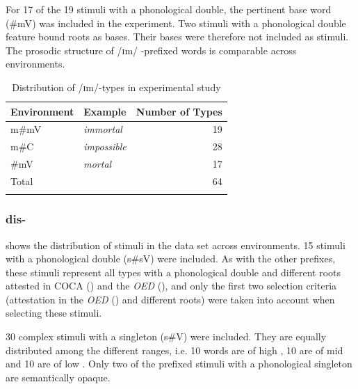 For 17 of the 19 stimuli with a phonological double, the pertinent base word ({\#mV}) was included in the experiment. Two stimuli with a phonological double feature bound roots as bases. Their bases were therefore not included as stimuli. The prosodic structure of /ɪm/ -prefixed words is comparable across environments.



\begin{table}

	\caption{Distribution of /ɪm/-types in experimental study}
	\label{tbl:distribution of im types in experiment}

	
		\begin{tabular} {llr}
\lsptoprule

Environment &Example &Number of   Types\\

 \midrule
 m\#mV&\color{lsMidBlue}\textit{immortal} & 19  \\
  m\#C&\color{lsMidBlue}\textit{impossible} & 28 \\
  \#mV&\color{lsMidBlue}\textit{mortal} & 17 \\
 \midrule
 Total& & 64\\
 \lspbottomrule                                                                                
		\end{tabular}
	
\end{table}



\subsubsection{dis-} \label{dis stimui}

 shows the distribution of  stimuli in the data set across environments. 
15  stimuli with a phonological double (s\#sV) were included. As with the other prefixes, these stimuli represent all types with a phonological double and different roots attested in  {COCA} (\citealt{Davies.20082014}) and the \textit{OED} (\citealt{OED.2013}),  and only the first two selection criteria (attestation in the \textit{OED} (\citealt{OED.2013}) and different roots) were taken into account when selecting these stimuli. 

30 complex stimuli with a singleton (s\#V) were included. They are equally distributed among the different  ranges, i.e. 10 words are of high , 10 are of mid  and 10 are of low . 
Only two of the prefixed stimuli with a phonological singleton are semantically opaque. 



